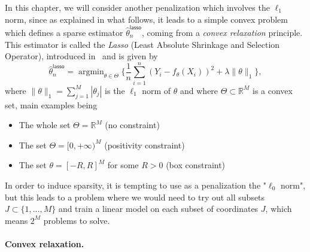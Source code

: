 \documentclass[
	fontsize=11pt, %
	twoside=false, %
	numbers=noenddot, %
]{kaobook}
\DeclareMathOperator*{\argmin}{argmin}
\newcommand{\R}{\mathbb R}
\newcommand{\wh}{\widehat}
\newcommand{\norm}[1]{\| #1 \|}
\begin{document}
In this chapter, we will consider another penalization which involves the $\ell_1$ norm, since as explained in what follows, it leads to a simple convex problem which defines a sparse estimator $\wh \theta_n^{\mathsf{lasso}}$, coming from a \emph{convex relaxation} principle.
This estimator is called the \emph{Lasso} (Least Absolute Shrinkage and Selection Operator), introduced in~ and is given by
\begin{equation}
	\label{eq:lasso-def}
		\wh \theta_n^{\mathsf{lasso}} = \argmin_{\theta \in \Theta} 
		\Big\{ \frac 1n \sum_{i=1}^n (Y_i - f_\theta(X_i))^2 + \lambda \norm{\theta}_1 \Big\},
\end{equation}
where $\norm{\theta}_1 = \sum_{j=1}^M |\theta_j|$ is the $\ell_1$ norm of $\theta$ and where $\Theta \subset \R^M$ is a convex set, main examples being
\begin{itemize}
 	\item The whole set $\Theta = \R^M$ (no constraint)
 	\item The set $\Theta = [0, +\infty)^M$ (positivity constraint)
 	\item The set $\theta = [-R, R]^M$ for some $R > 0$ (box constraint)
 \end{itemize}
In order to induce sparsity, it is tempting to use as a penalization the "$\ell_0$ norm", but this leads to a problem where we would need to try out all subsets $J \subset \{ 1, \ldots, M \}$ and train a linear model on each subset of coordinates $J$, which means $2^M$ problems to solve.

\paragraph{Convex relaxation.} %
\end{document}
